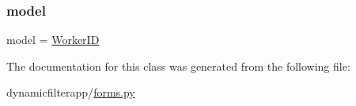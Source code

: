 \subsubsection{\texorpdfstring{model}{model}}
{\footnotesize\ttfamily model = \mbox{\hyperlink{classdynamicfilterapp_1_1models_1_1_worker_i_d}{Worker\+ID}}\hspace{0.3cm}{\ttfamily [static]}}



The documentation for this class was generated from the following file\+:\begin{DoxyCompactItemize}
\item 
dynamicfilterapp/\mbox{\hyperlink{forms_8py}{forms.\+py}}\end{DoxyCompactItemize}
